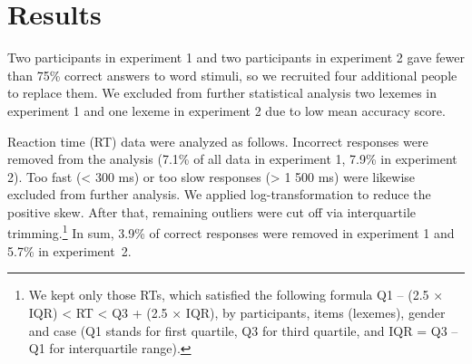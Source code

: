 \documentclass[output=paper, modfonts,newtxmath,hidelinks]{langscibook}
\begin{document}
\section{Results}
Two participants in experiment 1 and two participants in experiment 2 gave fewer than 75\% correct answers to word stimuli, so we recruited four additional people to replace them. We excluded from further  statistical analysis two lexemes in experiment 1 and one lexeme in experiment 2 due to low mean accuracy score.

Reaction time (RT) data were analyzed as follows. Incorrect responses were removed from the analysis (7.1\% of all data in experiment 1, 7.9\% in experiment 2). Too fast (< 300 ms) or too slow responses (> 1 500 ms) were likewise excluded from further analysis. We applied log-transformation to reduce the positive skew. After that, remaining outliers were cut off via interquartile trimming.\footnote{We kept only those RTs, which satisfied the following formula Q1 – (2.5 × IQR) < RT < Q3 + (2.5 × IQR), by participants, items (lexemes), gender and case (Q1 stands for first quartile, Q3 for third quartile, and IQR = Q3 – Q1 for interquartile range).} In sum, 3.9\% of correct responses were removed in experiment 1 and 5.7\% in experiment~2.
\end{document}
